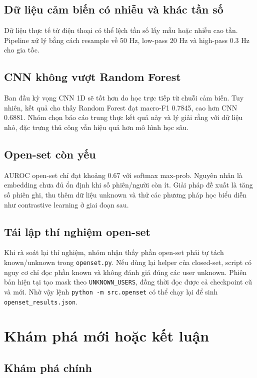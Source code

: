 \documentclass[12pt,a4paper]{article}
\begin{document}
\subsection{Dữ liệu cảm biến có nhiễu và khác tần số}

Dữ liệu thực tế từ điện thoại có thể lệch tần số lấy mẫu hoặc nhiễu cao tần. Pipeline xử lý bằng cách resample về 50 Hz, low-pass 20 Hz và high-pass 0.3 Hz cho gia tốc.

\subsection{CNN không vượt Random Forest}

Ban đầu kỳ vọng CNN 1D sẽ tốt hơn do học trực tiếp từ chuỗi cảm biến. Tuy nhiên, kết quả cho thấy Random Forest đạt macro-F1 0.7845, cao hơn CNN 0.6881. Nhóm chọn báo cáo trung thực kết quả này và lý giải rằng với dữ liệu nhỏ, đặc trưng thủ công vẫn hiệu quả hơn mô hình học sâu.

\subsection{Open-set còn yếu}

AUROC open-set chỉ đạt khoảng 0.67 với softmax max-prob. Nguyên nhân là embedding chưa đủ ổn định khi số phiên/người còn ít. Giải pháp đề xuất là tăng số phiên ghi, thu thêm dữ liệu unknown và thử các phương pháp học biểu diễn như contrastive learning ở giai đoạn sau.

\subsection{Tái lập thí nghiệm open-set}

Khi rà soát lại thí nghiệm, nhóm nhận thấy phần open-set phải tự tách known/unknown trong \texttt{openset.py}. Nếu dùng lại helper của closed-set, script có nguy cơ chỉ đọc phần known và không đánh giá đúng các user unknown. Phiên bản hiện tại tạo mask theo \texttt{UNKNOWN\_USERS}, đồng thời đọc được cả checkpoint cũ và mới. Nhờ vậy lệnh \texttt{python -m src.openset} có thể chạy lại để sinh \texttt{openset\_results.json}.

\section{Khám phá mới hoặc kết luận}

\subsection{Khám phá chính}
\end{document}
